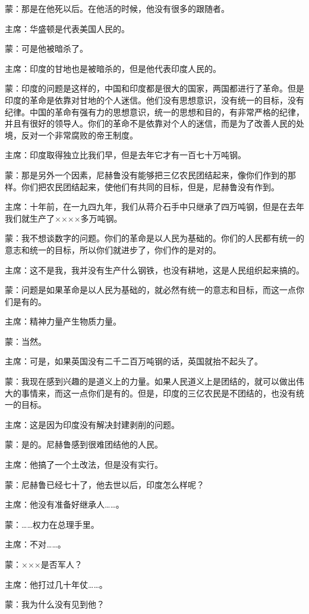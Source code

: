 蒙：那是在他死以后。在他活的时候，他没有很多的跟随者。

主席：华盛顿是代表美国人民的。

蒙：可是他被暗杀了。

主席：印度的甘地也是被暗杀的，但是他代表印度人民的。

蒙：印度的问题是这样的，中国和印度都是很大的国家，两国都进行了革命。但是印度的革命是依靠对甘地的个人迷信。他们没有思想意识，没有统一的目标，没有纪律。中国的革命有强有力的思想意识，统一的思想和目的，有非常严格的纪律，并且有很好的领导人。你们的革命不是依靠对个人的迷信，而是为了改善人民的处境，反对一个非常腐败的帝王制度。

主席：印度取得独立比我们早，但是去年它才有一百七十万吨钢。

蒙：那是另外一个因素，尼赫鲁没有能够把三亿农民团结起来，像你们作到的那样。你们把农民团结起来，使他们有共同的目标，但是，尼赫鲁没有作到。

主席：十年前，在一九四九年，我们从蒋介石手中只继承了四万吨钢，但是在去年我们就生产了××××多万吨钢。

蒙：我不想谈数字的问题。你们的革命是以人民为基础的。你们的人民都有统一的意志和统一的目标，所以你们就进步了，你们作的是对的。

主席：这不是我，我并没有生产什么钢铁，也没有耕地，这是人民组织起来搞的。

蒙：问题是如果革命是以人民为基础的，就必然有统一的意志和目标，而这一点你们是有的。

主席：精神力量产生物质力量。

蒙：当然。

主席：可是，如果英国没有二千二百万吨钢的话，英国就抬不起头了。

蒙：我现在感到兴趣的是道义上的力量。如果人民道义上是团结的，就可以做出伟大的事情来，而这一点你们是有的。但是，印度的三亿农民是不团结的，也没有统一的目标。

主席：这是因为印度没有解决封建剥削的问题。

蒙：是的。尼赫鲁感到很难团结他的人民。

主席：他搞了一个土改法，但是没有实行。

蒙：尼赫鲁已经七十了，他去世以后，印度怎么样呢？

主席：他没有准备好继承人……。

蒙：……权力在总理手里。

主席：不对……。

蒙：×××是否军人？

主席：他打过几十年仗……。

蒙：我为什么没有见到他？

